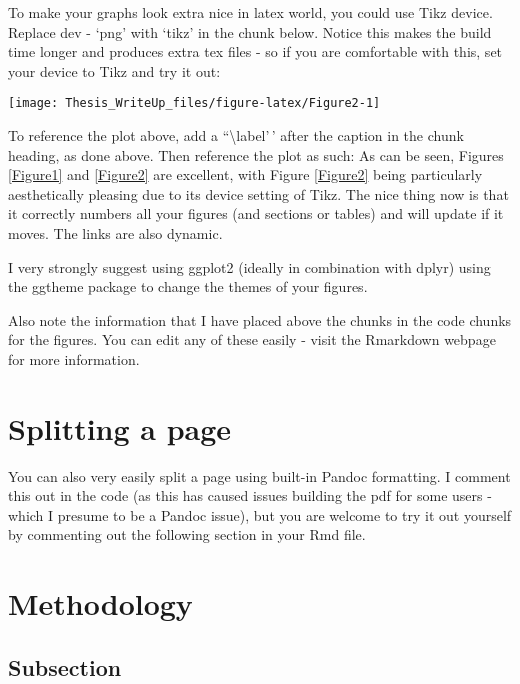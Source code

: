 \documentclass[11pt,preprint, authoryear]{elsarticle}
\let\origfigure\figure
\let\endorigfigure\endfigure
\renewenvironment{figure}[1][2] {
    \expandafter\origfigure\expandafter[H]
} {
    \endorigfigure
}
\numberwithin{equation}{section}
\numberwithin{figure}{section}
\numberwithin{table}{section}
\begin{document}
To make your graphs look extra nice in latex world, you could use Tikz
device. Replace dev - `png' with `tikz' in the chunk below. Notice this
makes the build time longer and produces extra tex files - so if you are
comfortable with this, set your device to Tikz and try it out:

\begin{figure}[H]

{\centering \texttt{[image: Thesis\_WriteUp\_files/figure-latex/Figure2-1]} 

}

\caption{Caption Here \label{Figure2}}\label{fig:Figure2}
\end{figure}

To reference the plot above, add a ``\textbackslash label'\,' after the
caption in the chunk heading, as done above. Then reference the plot as
such: As can be seen, Figures \ref{Figure1} and \ref{Figure2} are
excellent, with Figure \ref{Figure2} being particularly aesthetically
pleasing due to its device setting of Tikz. The nice thing now is that
it correctly numbers all your figures (and sections or tables) and will
update if it moves. The links are also dynamic.

I very strongly suggest using ggplot2 (ideally in combination with
dplyr) using the ggtheme package to change the themes of your figures.

Also note the information that I have placed above the chunks in the
code chunks for the figures. You can edit any of these easily - visit
the Rmarkdown webpage for more information.

\hypertarget{splitting-a-page}{%
\section{Splitting a page}\label{splitting-a-page}}

You can also very easily split a page using built-in Pandoc formatting.
I comment this out in the code (as this has caused issues building the
pdf for some users - which I presume to be a Pandoc issue), but you are
welcome to try it out yourself by commenting out the following section
in your Rmd file.

\hypertarget{methodology}{%
\section{\texorpdfstring{Methodology
\label{Meth}}{Methodology }}\label{methodology}}

\hypertarget{subsection}{%
\subsection{Subsection}\label{subsection}}
\end{document}
